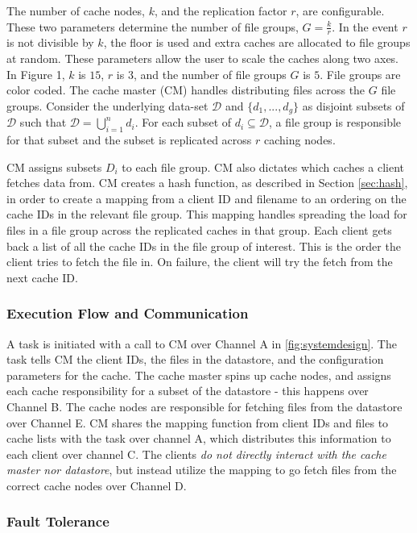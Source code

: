 \documentclass[sigconf]{acmart}
\begin{document}
The number of cache nodes, $k$, and the replication factor $r$, are configurable. These two parameters determine the number of file groups, $G=\frac{k}{r}$. In the event $r$ is not divisible by $k$, the floor is used and extra caches are allocated to file groups at random. These parameters allow the user to scale the caches along two axes. In Figure 1, $k$ is $15$, $r$ is $3$, and the number of file groups $G$ is $5$. File groups are color coded. The cache master (CM) handles distributing files across the $G$ file groups. Consider the underlying data-set $\mathcal{D}$ and $\{d_1, ..., d_g\}$ as disjoint subsets of $\mathcal{D}$ such that $\mathcal{D} = \bigcup_{i = 1}^n d_i$. For each subset of $d_i \subseteq \mathcal{D}$, a file group is responsible for that subset and the subset is replicated across $r$ caching nodes. 


CM assigns subsets $D_i$ to each file group. CM also dictates which caches a client fetches data from. CM creates a hash function, as described in Section \ref{sec:hash}, in order to create a mapping from a client ID and filename to an ordering on the cache IDs in the relevant file group. This mapping handles spreading the load for files in a file group across the replicated caches in that group. Each client gets back a list of all the cache IDs in the file group of interest. This is the order the client tries to fetch the file in. On failure, the client will try the fetch from the next cache ID.

\subsubsection{Execution Flow and Communication}
\label{sec:execution}

A task is initiated with a call to CM over Channel A in \ref{fig:systemdesign}. The task tells CM the client IDs, the files in the datastore, and the configuration parameters for the cache. The cache master spins up cache nodes, and assigns each cache responsibility for a subset of the datastore - this happens over Channel B. The cache nodes are responsible for fetching files from the datastore over Channel E. CM shares the mapping function from client IDs and files to cache lists with the task over channel A, which distributes this information to each client over channel C. The clients \textit{do not directly interact with the cache master nor datastore}, but instead utilize the mapping to go fetch files from the correct cache nodes over Channel D. 

\subsubsection{Fault Tolerance}
\label{sec:faulttolerance}
\end{document}
